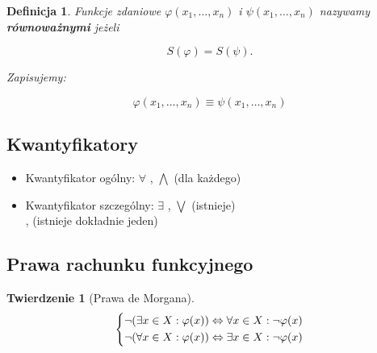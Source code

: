 \documentclass[a5paper,8pt]{article}
\newtheorem{definition}{Definicja}[section]
\newtheorem{theorem}{Twierdzenie}[section]
\newcommand\tab[1][1cm]{\hspace*{#1}}
\begin{document}
        \begin{definition}
            Funkcje zdaniowe $ \varphi (x_1, \ldots, x_n) $ i $ \psi (x_1, \ldots, x_n) $ nazywamy \textbf{równoważnymi} jeżeli

            \begin{equation*}
                S(\varphi) = S(\psi).
            \end{equation*}

            Zapisujemy:

            \begin{equation*}
                \varphi (x_1, \ldots, x_n) \equiv \psi (x_1, \ldots, x_n)
            \end{equation*}

        \end{definition}


        \subsection{Kwantyfikatory} %
        \label{sub:kwantyfikatory}
            \begin{itemize}
                \item Kwantyfikator ogólny: {\LARGE $ \forall $ }, $ \bigwedge $ (dla każdego)
                \item Kwantyfikator szczególny: {\LARGE $ \exists $ }, $ \bigvee $ (istnieje)\\
                \tab \tab \tab \tab {\LARGE $ \exists ! $ }, (istnieje dokładnie jeden)
            \end{itemize}

        \subsection{Prawa rachunku funkcyjnego} %
        \label{sub:prawa_rachunku_funkcyjnego}

            \begin{theorem}[Prawa de Morgana]
                \[
                    \begin{dcases*}
                    \neg( \exists x \in X : \varphi(x)) \Leftrightarrow \forall x \in X : \neg \varphi(x) \\
                    \neg( \forall x \in X : \varphi(x)) \Leftrightarrow \exists x \in X : \neg \varphi(x)
                    \end{dcases*}
                \]
            \end{theorem}
\end{document}
